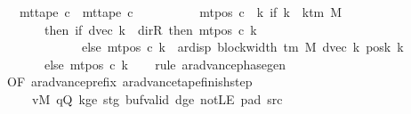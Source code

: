 \begin{isabellebody}
\ \ \ \ \ \ \ \ \ {\isasymand}\ mt{\isacharunderscore}{\kern0pt}tape\ c\ {\isacharequal}{\kern0pt}\ mt{\isacharunderscore}{\kern0pt}tape\ c{}\isanewline
\ \ \ \ \ \ \ \ \ {\isasymand}\ mt{\isacharunderscore}{\kern0pt}pos\ c\ {\isacharequal}{\kern0pt}\ {\isacharparenleft}{\kern0pt}{\isasymlambda}k{\isachardot}{\kern0pt}\ if\ k\ {\isacharless}{\kern0pt}\ k{\isacharunderscore}{\kern0pt}tm\ M\isanewline
\ \ \ \ \ \ \ \ \ \ \ \ \ \ then\ {\isacharparenleft}{\kern0pt}if\ dvec\ k\ {\isacharequal}{\kern0pt}\ dir{\isachardot}{\kern0pt}R\ then\ mt{\isacharunderscore}{\kern0pt}pos\ c{}\ k\isanewline
\ \ \ \ \ \ \ \ \ \ \ \ \ \ \ \ \ \ \ \ else\ mt{\isacharunderscore}{\kern0pt}pos\ c{}\ k\ {\isacharminus}{\kern0pt}\ ar{\isacharunderscore}{\kern0pt}disp\ {\isacharparenleft}{\kern0pt}block{\isacharunderscore}{\kern0pt}width\ {\isacharparenleft}{\kern0pt}{\isasymGamma}{\isacharunderscore}{\kern0pt}tm\ M{\isacharparenright}{\kern0pt}{\isacharparenright}{\kern0pt}\ {\isacharparenleft}{\kern0pt}dvec\ k{\isacharparenright}{\kern0pt}\ {\isacharparenleft}{\kern0pt}posk{}\ k{\isacharparenright}{\kern0pt}{\isacharparenright}{\kern0pt}\isanewline
\ \ \ \ \ \ \ \ \ \ \ \ \ \ else\ mt{\isacharunderscore}{\kern0pt}pos\ c{}\ k{\isacharparenright}{\kern0pt}{\isachardoublequoteclose}\isanewline
%
\isadelimproof
\ \ %
\endisadelimproof
%
\isatagproof
{}\isamarkupfalse%
\ {\isacharparenleft}{\kern0pt}rule\ ar{\isacharunderscore}{\kern0pt}advance{\isacharunderscore}{\kern0pt}phase{\isacharunderscore}{\kern0pt}gen\isanewline
\ \ \ \ \ \ \ \ {\isacharbrackleft}{\kern0pt}OF\ ar{\isacharunderscore}{\kern0pt}advance{\isacharunderscore}{\kern0pt}prefix\ ar{\isacharunderscore}{\kern0pt}advance{\isacharunderscore}{\kern0pt}tape{\isacharunderscore}{\kern0pt}finish{\isacharunderscore}{\kern0pt}step\isanewline
\ \ \ \ \ \ \ \ \ \ \ \ vM\ qQ\ kge{}\ stg{}\ buf{\isacharunderscore}{\kern0pt}valid\ dge{}\ notLE\ pad{}\ src{}{\isacharbrackright}{\kern0pt}{\isacharparenright}{\kern0pt}%
\endisatagproof
{\isafoldproof}%
%
\isadelimproof
\isanewline
%
\endisadelimproof
%
\isadelimtheory
\isanewline
%
\endisadelimtheory
%
\isatagtheory
{}\isamarkupfalse%
%
\endisatagtheory
{\isafoldtheory}%
%
\isadelimtheory
%
\endisadelimtheory
%
\end{isabellebody}%
\endinput
